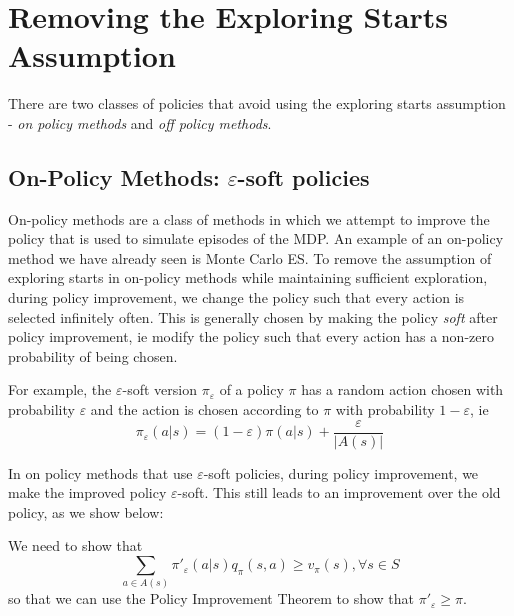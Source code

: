 \documentclass[12pt]{report}
\begin{document}
\section{Removing the Exploring Starts Assumption}
There are two classes of policies that avoid using the exploring starts assumption - \textit{on policy methods} and \textit{off policy methods}.
\subsection{\texorpdfstring{On-Policy Methods: $\varepsilon$-soft policies}{}}
On-policy methods are a class of methods in which we attempt to improve the policy that is used to simulate episodes of the MDP. An example of an on-policy method we have already seen is Monte Carlo ES. To remove the assumption of exploring starts in on-policy methods while maintaining sufficient exploration, during policy improvement, we change the policy such that every action is selected infinitely often. This is generally chosen by making the policy \textit{soft} after policy improvement, ie modify the policy such that every action has a non-zero probability of being chosen. 

For example, the $\varepsilon$-soft version $\pi_{\varepsilon}$ of a policy $\pi$ has a random action chosen with probability $\varepsilon$ and the action is chosen according to $\pi$ with probability $1 - \varepsilon$, ie
\begin{equation}
    \pi_{\varepsilon}(a | s) = (1 - \varepsilon)\pi(a | s) + \frac{\varepsilon}{\left|A(s)\right|}
\end{equation}

In on policy methods that use $\varepsilon$-soft policies, during policy improvement, we make the improved policy $\varepsilon$-soft. This still leads to an improvement over the old policy, as we show below:

We need to show that
\begin{equation}
    \sum_{a \in A(s)} \pi'_{\varepsilon}(a | s) q_{\pi}(s, a) \geq v_{\pi}(s), \forall s \in S
\end{equation}
so that we can use the Policy Improvement Theorem to show that $\pi'_{\varepsilon} \geq \pi$.
\end{document}
